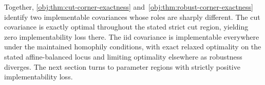 Together, \cref{obj:thm:cut-corner-exactness} and~\cref{obj:thm:robust-corner-exactness} identify two implementable covariances whose roles are sharply different. The cut covariance is exactly optimal throughout the stated strict cut region, yielding zero implementability loss there. The iid covariance is implementable everywhere under the maintained homophily conditions, with exact relaxed optimality on the stated affine-balanced locus and limiting optimality elsewhere as robustness diverges. The next section turns to parameter regions with strictly positive implementability loss.
